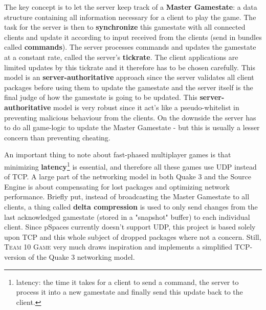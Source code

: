 The key concept is to let the server keep track of a \textbf{Master Gamestate}: a data structure containing all information necessary for a client to play the game. The task for the server is then to \textbf{synchronize} this gamestate with all connected clients and update it according to input received from the clients (send in bundles called \textbf{commands}). The server processes commands and updates the gamestate at a constant rate, called the server's \textbf{tickrate}. The client applications are limited updates by this tickrate and it therefore has to be chosen carefully. 
This model is an \textbf{server-authoritative} approach since the server validates all client packages before using them to update the gamestate and the server itself is the final judge of how the gamestate is going to be updated. This \textbf{server-authoritative} model is very robust since it act's like a pseudo-whitelist in preventing malicious behaviour from the clients. On the downside the server has to do all game-logic to update the Master Gamestate - but this is usually a lesser concern than preventing cheating. 

An important thing to note about fast-phased multiplayer games is that minimizing \textbf{latency}\footnote{latency: the time it takes for a client to send a command, the server to process it into a new gamestate and finally send this update back to the client.} is essential, and therefore all these games use UDP instead of TCP. A large part of the networking model in both Quake 3 and the Source Engine is about compensating for lost packages and optimizing network performance. Briefly put, instead of broadcasting the Master Gamestate to all clients, a thing called \textbf{delta compression} is used to only send changes from the last acknowledged gamestate (stored in a "snapshot" buffer) to each individual client. Since pSpaces currently doesn't support UDP, this project is based solely upon TCP and this whole subject of dropped packages where not a concern. Still, \textsc{Team 10 Game} very much draws inspiration and implements a simplified TCP-version of the Quake 3 networking model.  
